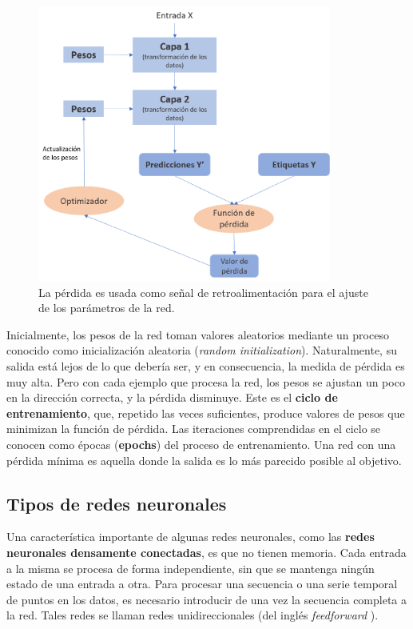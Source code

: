 \begin{figure}[!h]
	\centering
	
	\includegraphics[width=3.8in]{Graphics/redBP.png}
	
	\caption{ \small{La pérdida es usada como señal de retroalimentación para el ajuste de los parámetros de la red.}}
	
	\label{RedBP}
	
\end{figure}

Inicialmente, los pesos de la red toman valores aleatorios mediante un proceso conocido como inicialización aleatoria (\textit{random initialization}).  Naturalmente, su salida está lejos de lo que debería ser, y en consecuencia, la medida de pérdida es muy alta. Pero con cada ejemplo que procesa la red, los pesos se ajustan un poco en la dirección correcta, y la pérdida disminuye. Este es el \textbf{ciclo de entrenamiento}, que, repetido las veces suficientes, produce valores de pesos que minimizan la función de pérdida. Las iteraciones comprendidas en el ciclo se conocen como épocas (\textbf{epochs}) del proceso de entrenamiento. Una red con una pérdida mínima es aquella donde la salida es lo más parecido posible al objetivo.
 
 \subsection{Tipos de redes neuronales}\label{1-NN}
 
Una característica importante de algunas redes neuronales, como las \textbf{redes neuronales densamente conectadas}, es que no tienen memoria. Cada entrada a la misma se procesa de forma independiente, sin que se mantenga ningún estado de una entrada a otra. Para procesar una secuencia o una serie temporal de puntos en los datos, es necesario introducir de una vez la secuencia completa a la red. Tales redes se llaman redes unidireccionales (del inglés  \textit{feedforward} ). 

